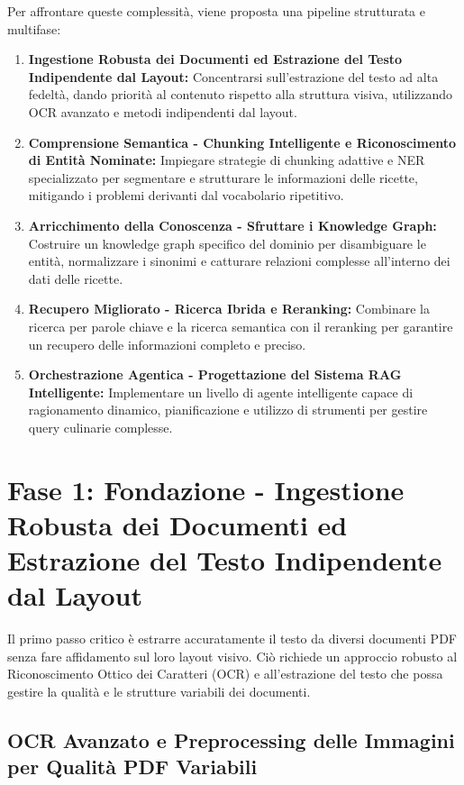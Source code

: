 \documentclass[a4paper, 11pt]{article}
\begin{document}
Per affrontare queste complessità, viene proposta una pipeline strutturata e multifase:
\begin{enumerate}
   \item \textbf{Ingestione Robusta dei Documenti ed Estrazione del Testo Indipendente dal Layout:} Concentrarsi sull'estrazione del testo ad alta fedeltà, dando priorità al contenuto rispetto alla struttura visiva, utilizzando OCR avanzato e metodi indipendenti dal layout.
   \item \textbf{Comprensione Semantica - Chunking Intelligente e Riconoscimento di Entità Nominate:} Impiegare strategie di chunking adattive e NER specializzato per segmentare e strutturare le informazioni delle ricette, mitigando i problemi derivanti dal vocabolario ripetitivo.
   \item \textbf{Arricchimento della Conoscenza - Sfruttare i Knowledge Graph:} Costruire un knowledge graph specifico del dominio per disambiguare le entità, normalizzare i sinonimi e catturare relazioni complesse all'interno dei dati delle ricette.
   \item \textbf{Recupero Migliorato - Ricerca Ibrida e Reranking:} Combinare la ricerca per parole chiave e la ricerca semantica con il reranking per garantire un recupero delle informazioni completo e preciso.
   \item \textbf{Orchestrazione Agentica - Progettazione del Sistema RAG Intelligente:} Implementare un livello di agente intelligente capace di ragionamento dinamico, pianificazione e utilizzo di strumenti per gestire query culinarie complesse.
\end{enumerate}

\section{Fase 1: Fondazione - Ingestione Robusta dei Documenti ed Estrazione del Testo Indipendente dal Layout}

Il primo passo critico è estrarre accuratamente il testo da diversi documenti PDF senza fare affidamento sul loro layout visivo. Ciò richiede un approccio robusto al Riconoscimento Ottico dei Caratteri (OCR) e all'estrazione del testo che possa gestire la qualità e le strutture variabili dei documenti.

\subsection{OCR Avanzato e Preprocessing delle Immagini per Qualità PDF Variabili}
\end{document}

